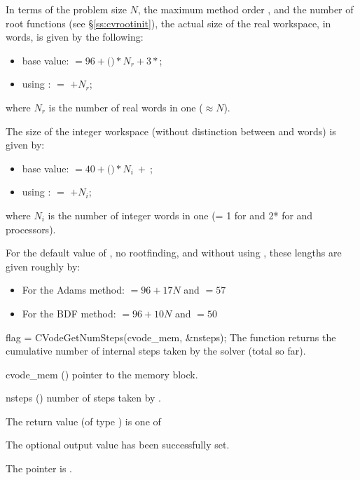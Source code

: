 {
  In terms of the problem size $N$, the maximum method order , and
  the number  of root functions (see \S\ref{ss:cvrootinit}),
  the actual size of the real workspace, in  words, is
  given by the following:
  \begin{itemize}
  \item base value:  $= 96 + ($$)*N_r + 3*$;
  \item using :  $=$  $+ N_r$;
  \end{itemize}
  where $N_r$ is the number of real words in one  ($\approx N$).

  The size of the integer workspace (without distinction between 
  and  words) is given by:
  \begin{itemize}
  \item base value:  $= 40 + ($$)*N_i ~ + ~ $;
  \item using :  $=$  $+ N_i$;
  \end{itemize}
  where $N_i$ is the number of integer words in one 
  (= 1 for {\nvecs} and 2* for {\nvecp} and  processors).

  For the default value of , no rootfinding, and without
  using , these lengths are given roughly by:
  \begin{itemize}
  \item For the Adams method:  $= 96 + 17N$ and  $= 57$
  \item For the BDF method:  $= 96 + 10N$ and  $= 50$
  \end{itemize}
}
{
  flag = CVodeGetNumSteps(cvode\_mem, \&nsteps);
}
{
  The function  returns the cumulative number of internal
  steps taken by the solver (total so far).
}
{
  \begin{args}
  \item[cvode\_mem] ()
    pointer to the {\cvode} memory block.
  \item[nsteps] ()
    number of steps taken by {\cvode}.
  \end{args}
}
{
  The return value  (of type ) is one of
  \begin{args}
  \item[\Id{CV\_SUCCESS}]
    The optional output value has been successfully set.
  \item[\Id{CV\_MEM\_NULL}]
    The  pointer is .
  \end{args}
}
